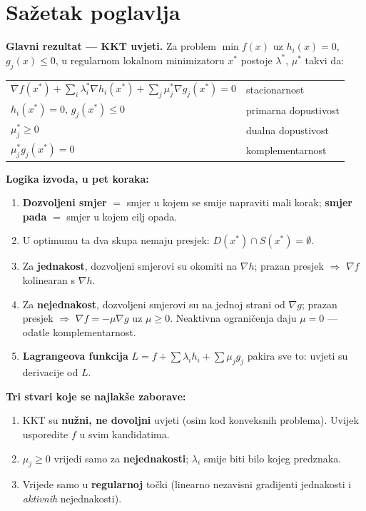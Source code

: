 \section{Sažetak poglavlja}

\textbf{Glavni rezultat --- KKT uvjeti.} Za problem
$\min f(x)$ uz $h_i(x)=0$, $g_j(x)\le0$, u regularnom lokalnom minimizatoru
$x^{*}$ postoje $\lambda^{*}$, $\mu^{*}$ takvi da:

\begin{center}
\begin{tabular}{ll}
\toprule
$\nabla f(x^{*}) + \sum_i\lambda_i^{*}\nabla h_i(x^{*})
  + \sum_j\mu_j^{*}\nabla g_j(x^{*}) = 0$ & stacionarnost \\
$h_i(x^{*}) = 0$, \quad $g_j(x^{*}) \le 0$ & primarna dopustivost \\
$\mu_j^{*} \ge 0$ & dualna dopustivost \\
$\mu_j^{*}g_j(x^{*}) = 0$ & komplementarnost \\
\bottomrule
\end{tabular}
\end{center}

\textbf{Logika izvoda, u pet koraka:}

\begin{enumerate}
  \item \textbf{Dozvoljeni smjer} $=$ smjer u kojem se smije napraviti mali
        korak; \textbf{smjer pada} $=$ smjer u kojem cilj opada.
  \item U optimumu ta dva skupa nemaju presjek:
        $D(x^{*}) \cap S(x^{*}) = \emptyset$.
  \item Za \textbf{jednakost}, dozvoljeni smjerovi su okomiti na $\nabla h$;
        prazan presjek $\Rightarrow$ $\nabla f$ kolinearan s $\nabla h$.
  \item Za \textbf{nejednakost}, dozvoljeni smjerovi su na jednoj strani od
        $\nabla g$; prazan presjek $\Rightarrow$ $\nabla f = -\mu\nabla g$ uz
        $\mu \ge 0$. Neaktivna ograničenja daju $\mu = 0$ --- odatle
        komplementarnost.
  \item \textbf{Lagrangeova funkcija} $L = f + \sum\lambda_ih_i +
        \sum\mu_jg_j$ pakira sve to: uvjeti su derivacije od $L$.
\end{enumerate}

\textbf{Tri stvari koje se najlakše zaborave:}

\begin{enumerate}
  \item KKT su \textbf{nužni, ne dovoljni} uvjeti (osim kod konveksnih
        problema). Uvijek usporedite $f$ u svim kandidatima.
  \item $\mu_j \ge 0$ vrijedi samo za \textbf{nejednakosti}; $\lambda_i$ smije
        biti bilo kojeg predznaka.
  \item Vrijede samo u \textbf{regularnoj} točki (linearno nezavisni gradijenti
        jednakosti i \emph{aktivnih} nejednakosti).
\end{enumerate}

